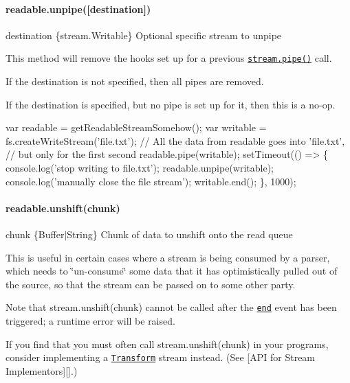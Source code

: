\paragraph*{readable.\+unpipe(\mbox{[}destination\mbox{]})}


\begin{DoxyItemize}
\item {\ttfamily destination} \{stream.\+Writable\} Optional specific stream to unpipe
\end{DoxyItemize}

This method will remove the hooks set up for a previous \href{#stream_readable_pipe_destination_options}{\tt {\ttfamily stream.\+pipe()}} call.

If the destination is not specified, then all pipes are removed.

If the destination is specified, but no pipe is set up for it, then this is a no-\/op.


\begin{DoxyCode}
var readable = getReadableStreamSomehow();
var writable = fs.createWriteStream('file.txt');
// All the data from readable goes into 'file.txt',
// but only for the first second
readable.pipe(writable);
setTimeout(() => \{
  console.log('stop writing to file.txt');
  readable.unpipe(writable);
  console.log('manually close the file stream');
  writable.end();
\}, 1000);
\end{DoxyCode}


\paragraph*{readable.\+unshift(chunk)}


\begin{DoxyItemize}
\item {\ttfamily chunk} \{Buffer$\vert$\+String\} Chunk of data to unshift onto the read queue
\end{DoxyItemize}

This is useful in certain cases where a stream is being consumed by a parser, which needs to \char`\"{}un-\/consume\char`\"{} some data that it has optimistically pulled out of the source, so that the stream can be passed on to some other party.

Note that {\ttfamily stream.\+unshift(chunk)} cannot be called after the \href{#stream_event_end}{\tt {\ttfamily \textquotesingle{}end\textquotesingle{}}} event has been triggered; a runtime error will be raised.

If you find that you must often call {\ttfamily stream.\+unshift(chunk)} in your programs, consider implementing a \href{#stream_class_stream_transform}{\tt Transform} stream instead. (See \mbox{[}A\+PI for Stream Implementors\mbox{]}\mbox{[}\mbox{]}.)


